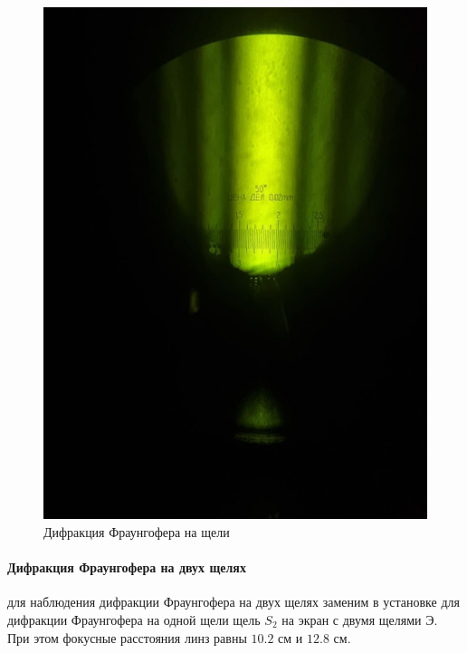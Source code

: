 \documentclass[a4paper,12pt]{article}
\begin{document}
\begin{figure}[H]
    \centering
    \includegraphics[scale=0.2]{pic_4.png}
    \caption{Дифракция Фраунгофера на щели}
\end{figure}

\paragraph{Дифракция Фраунгофера на двух щелях} для наблюдения дифракции Фраунгофера на двух щелях заменим в установке для дифракции Фраунгофера на одной щели щель $S_2$ на экран с двумя щелями Э. При этом фокусные расстояния линз равны $10.2$ см и $12.8$ см.
\end{document}
